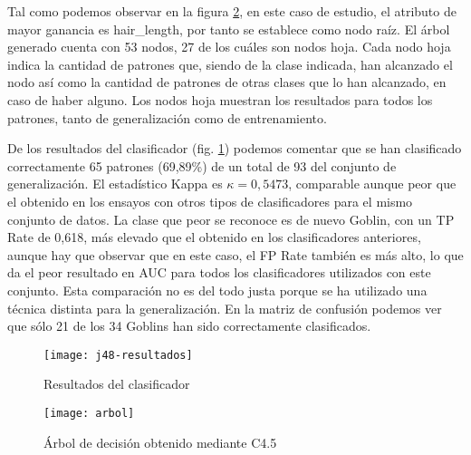 Tal como podemos observar en la figura \ref{fig:j48-arbol}, en este caso de estudio, el atributo de mayor ganancia es hair\_length, por tanto se establece como nodo raíz. El árbol generado cuenta con 53 nodos, 27 de los cuáles son nodos hoja. Cada nodo hoja indica la cantidad de patrones que, siendo de la clase indicada, han alcanzado el nodo así como la cantidad de patrones de otras clases que lo han alcanzado, en caso de haber alguno. Los nodos hoja muestran los resultados para todos los patrones, tanto de generalización como de entrenamiento.

De los resultados del clasificador (fig. \ref{fig:j48-resultados}) podemos comentar que se han clasificado correctamente 65 patrones (69,89\%) de un total de 93 del conjunto de generalización. El estadístico Kappa es $\kappa=0,5473$, comparable aunque peor que el obtenido en los ensayos con otros tipos de clasificadores para el mismo conjunto de datos. La clase que peor se reconoce es de nuevo Goblin, con un TP Rate de 0,618, más elevado que el obtenido en los clasificadores anteriores, aunque hay que observar que en este caso, el FP Rate también es más alto, lo que da el peor resultado en AUC para todos los clasificadores utilizados con este conjunto. Esta comparación no es del todo justa porque se ha utilizado una técnica distinta para la generalización. En la matriz de confusión podemos ver que sólo 21 de los 34 Goblins han sido correctamente clasificados.

\begin{figure}[ht]
    \centering
    \texttt{[image: j48-resultados]}
    \caption{Resultados del clasificador }
    \label{fig:j48-resultados}
\end{figure}

\begin{landscape}
\begin{figure}[!h]
    \centering
    \texttt{[image: arbol]}
    \caption{Árbol de decisión obtenido mediante C4.5}
    \label{fig:j48-arbol}
\end{figure}
\end{landscape}



\clearpage
